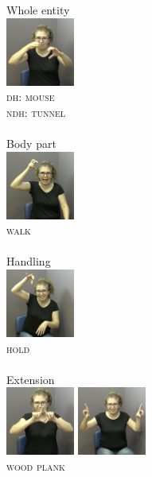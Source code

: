\documentclass[
  english,
  doc,mask]{apa6}
\begin{document}
\begin{multicols}{4}
\begin{exe}
\ex
\begin{xlist}
\ex Whole entity \\\glll 
\includegraphics[width=2.25cm]{pictures/3a.png} \\ {\textsc{dh: mouse}} \\ {\textsc{ndh: tunnel}}\\ \\
\ex Body part \\\glll
\includegraphics[width=2.25cm]{pictures/3b.png} \\ \textsc{walk} \\ \\ 
\ex Handling \\\glll 
\includegraphics[width=2.25cm]{pictures/3c.png} \\ \textsc{hold} \\ \\
\ex Extension \\\glll 
\includegraphics[width=2.25cm]{pictures/3d_1.png} \includegraphics[width=2.25cm]{pictures/3d_2.png}\\ \textsc{wood} \textsc{plank}\\ \\
\end{xlist}
\end{exe}
\end{multicols}
\end{document}
